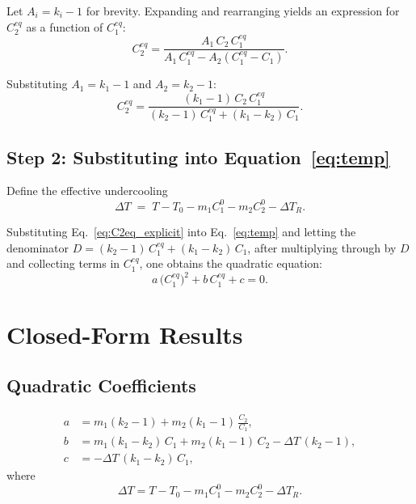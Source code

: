\documentclass[12pt, a4paper]{article}
\begin{document}
Let $A_i = k_i - 1$ for brevity. Expanding and rearranging yields an expression
for $C_2^{eq}$ as a function of $C_1^{eq}$:
\begin{equation}
  C_2^{eq}
  = \frac{A_1\, C_2\, C_1^{eq}}
         {A_1\, C_1^{eq} - A_2\!\left(C_1^{eq} - C_1\right)} .
  \label{eq:C2eq}
\end{equation}

Substituting $A_1 = k_1 - 1$ and $A_2 = k_2 - 1$:
\begin{equation}
  C_2^{eq}
  = \frac{(k_1-1)\,C_2\,C_1^{eq}}
         {(k_2-1)\,C_1^{eq} + (k_1 - k_2)\,C_1} .
  \label{eq:C2eq_explicit}
\end{equation}

\subsection{Step 2: Substituting into Equation~\eqref{eq:temp}}

Define the effective undercooling
\[
  \Delta T \;=\; T - T_0 - m_1 C_1^0 - m_2 C_2^0 - \Delta T_R .
\]

Substituting Eq.~\eqref{eq:C2eq_explicit} into Eq.~\eqref{eq:temp} and letting
the denominator $D = (k_2-1)\,C_1^{eq} + (k_1-k_2)\,C_1$, after multiplying through
by $D$ and collecting terms in $C_1^{eq}$, one obtains the quadratic equation:
\begin{equation}
  a\,\bigl(C_1^{eq}\bigr)^2 + b\,C_1^{eq} + c = 0 .
  \label{eq:quadratic}
\end{equation}

\section{Closed-Form Results}

\subsection{Quadratic Coefficients}

\begin{align}
  a &= m_1(k_2-1) + m_2(k_1-1)\,\frac{C_2}{C_1} , \label{eq:coef_a} \\[4pt]
  b &= m_1(k_1-k_2)\,C_1 + m_2(k_1-1)\,C_2 - \Delta T\,(k_2-1) , \label{eq:coef_b} \\[4pt]
  c &= -\Delta T\,(k_1-k_2)\,C_1 , \label{eq:coef_c}
\end{align}
where
\[
  \Delta T = T - T_0 - m_1 C_1^0 - m_2 C_2^0 - \Delta T_R .
\]
\end{document}
